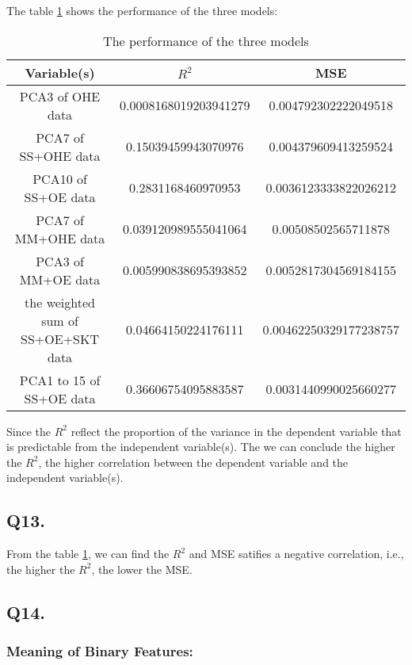 \documentclass{article}
\begin{document}
The table \ref{tab:Regression} shows the performance of the three models:

\begin{table}[h!]
    \centering
    \small
    \begin{tabular}{|c|c|c|}
        \hline
        Variable(s) & $R^2$ & MSE  \\
        \hline
        PCA3 of OHE data & 0.0008168019203941279 & 0.004792302222049518 \\
        PCA7 of SS+OHE data & 0.15039459943070976 & 0.004379609413259524  \\
        PCA10 of SS+OE data & 0.2831168460970953 & 0.0036123333822026212  \\
        PCA7 of MM+OHE data & 0.039120989555041064 & 0.00508502565711878 \\
        PCA3 of MM+OE data & 0.005990838695393852 & 0.0052817304569184155 \\
        the weighted sum of SS+OE+SKT data & 0.04664150224176111 & 0.00462250329177238757 \\
        PCA1 to 15 of SS+OE data & 0.36606754095883587 & 0.0031440990025660277  \\
        \hline
    \end{tabular}
    \caption{The performance of the three models}
    \label{tab:Regression}
\end{table}

Since the $R^2$ reflect the proportion of the variance in the dependent variable that is predictable from the independent variable(s). The we can conclude the higher the $R^2$, the higher correlation between the dependent variable and the independent variable(s).

\subsection*{Q13.}

From the table \ref{tab:Regression}, we can find the $R^2$ and MSE satifies a negative correlation, i.e., the higher the $R^2$, the lower the MSE. 


\subsection*{Q14.}

\subsubsection*{Meaning of Binary Features:}
\end{document}
